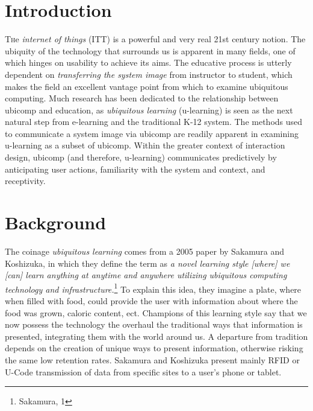 \documentclass[twoside]{article}
\begin{document}
\begin{multicols}{2} %

\section{Introduction}

\lettrine[nindent=0em,lines=3]{T}he \emph{internet of things} (ITT) is a powerful and very real 21st century notion. The ubiquity of the technology that surrounds us is apparent in many fields, one of which hinges on usability to achieve its aims. The educative process is utterly dependent on \emph{transferring the system image} from instructor to student, which makes the field an excellent vantage point from which to examine ubiquitous computing. Much research has been dedicated to the relationship between ubicomp and education, as \emph{ubiquitous learning} (u-learning) is seen as the next natural step from e-learning and the traditional K-12 system. The methods used to communicate a system image via ubicomp are readily apparent in examining u-learning as a subset of ubicomp. Within the greater context of interaction design, ubicomp (and therefore, u-learning) communicates predictively by anticipating user actions, familiarity with the system and context, and receptivity.


\section{Background}

\setlength\parindent{24pt}The coinage \emph{ubiquitous learning} comes from a 2005 paper by Sakamura and Koshizuka, in which they define the term as \emph{a novel learning style [where] we [can] learn anything at anytime and anywhere utilizing ubiquitous computing technology and infrastructure.}\footnote{Sakamura, 1} To explain this idea, they imagine a plate, where when filled with food, could provide the user with information about where the food was grown, caloric content, ect. Champions of this learning style say that we now possess the technology the overhaul the traditional ways that information is presented, integrating them with the world around us. A departure from tradition depends on the creation of unique ways to present information, otherwise risking the same low retention rates. Sakamura and Koshizuka present mainly RFID or U-Code transmission of data from specific sites to a user's phone or tablet. 


\end{multicols}
\end{document}
